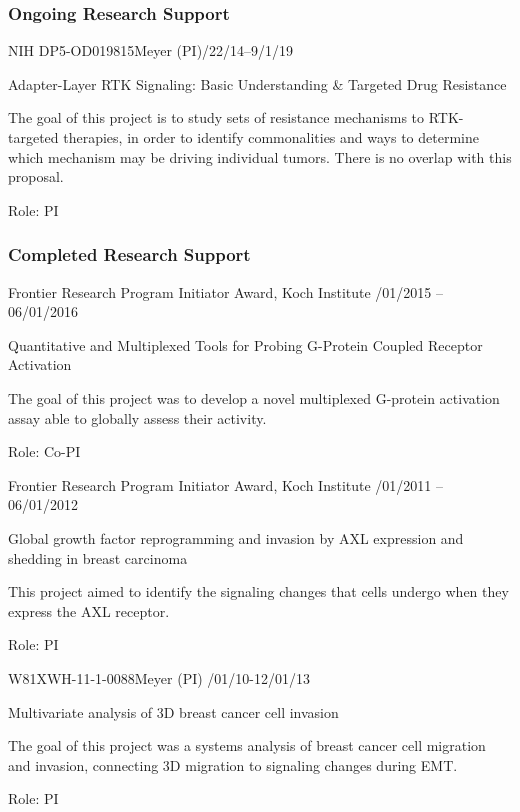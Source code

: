 \documentclass[12pt]{article}
\begin{document}
\subsubsection{Ongoing Research Support}

NIH DP5-OD019815\tab  Meyer (PI)/22/14--9/1/19

Adapter-Layer RTK Signaling: Basic Understanding \& Targeted Drug Resistance

The goal of this project is to study sets of resistance mechanisms to RTK-targeted therapies, in order to identify commonalities and ways to determine which mechanism may be driving individual tumors. There is no overlap with this proposal.

Role: PI

\subsubsection{Completed Research Support}

Frontier Research Program Initiator Award, Koch Institute /01/2015 -- 06/01/2016

Quantitative and Multiplexed Tools for Probing G-Protein Coupled Receptor Activation

The goal of this project was to develop a novel multiplexed G-protein activation assay able to globally assess their activity.

Role: Co-PI

\vspace{12pt}


Frontier Research Program Initiator Award, Koch Institute /01/2011 -- 06/01/2012

Global growth factor reprogramming and invasion by AXL expression and shedding in breast carcinoma

This project aimed to identify the signaling changes that cells undergo when they express the AXL receptor.

Role: PI

\vspace{12pt}


W81XWH-11-1-0088\tab Meyer (PI) /01/10-12/01/13

Multivariate analysis of 3D breast cancer cell invasion

The goal of this project was a systems analysis of breast cancer cell migration and invasion, connecting 3D migration to signaling changes during EMT.

Role: PI
\end{document}
